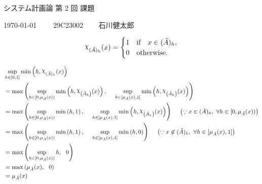 \documentclass[uplatex, a4j, 10pt, fleqn, dvipdfmx]{article}
\newcommand{\irchi}[2]{\raisebox{\depth}{$#1\chi$}}
\DeclareRobustCommand{\rchi}{{\mathpalette\irchi\relax}}
\begin{document}
\begin{center}
	{\Huge システム計画論 第 2 回 課題}
\end{center}

\begin{flushright}
	{\Large \today ~~~~ 29C23002 ~~~ 石川健太郎}
\end{flushright}

\begin{align}
	\rchi_{( \tilde{A} )_h}(x) =
	\begin{cases}
		1 & \text{if} ~~~ x \in ( \tilde{A} )_h, \\
		0 & \text{otherwise}.
	\end{cases}
\end{align}

\begin{align}
	 & \sup_{h \in [0, 1]} \min \left( h, \rchi_{( \tilde{A} )_h}(x) \right)
	\\
	 & = \max \left(
	\sup_{h \in \left[ 0, \mu_{\tilde{A}}(x) \right)} \min \left( h, \rchi_{\left( \tilde{A}_h \right)}(x) \right), ~~~~
	\sup_{h \in \left[ \mu_{\tilde{A}}(x), 1 \right]} \min \left( h, \rchi_{\left( \tilde{A}_h \right)}(x) \right)
	\right)
	\\
	 & = \max \left(
	\sup_{h \in \left[ 0, \mu_{\tilde{A}}(x) \right)} \min \left( h, 1 \right), ~~~~
	\sup_{h \in \left[ \mu_{\tilde{A}}(x), 1 \right]} \min \left( h, \rchi_{\left( \tilde{A}_h \right)}(x) \right)
	\right) ~~~~
	\left( \because x \in ( \tilde{A} )_h, ~ \forall h \in \left[ 0, \mu_{\tilde{A}}(x) \right) \right)
	\\
	 & = \max \left(
	\sup_{h \in \left[ 0, \mu_{\tilde{A}}(x) \right)} \min \left( h, 1 \right), ~~~~
	\sup_{h \in \left[ \mu_{\tilde{A}}(x), 1 \right]} \min \left( h, 0 \right)
	\right) ~~~~
	\left( \because x \not\in ( \tilde{A} )_h, ~ \forall h \in \left[ \mu_{\tilde{A}}(x), 1 \right] \right)
	\\
	 & = \max \left(
	\sup_{h \in \left[ 0, \mu_{\tilde{A}}(x) \right)} h, ~~ 0
	\right)
	\\
	 & = \max \left( \mu_{\tilde{A}}(x), ~~ 0 \right)
	\\
	 & = \mu_{\tilde{A}}(x)
\end{align}
\end{document}
